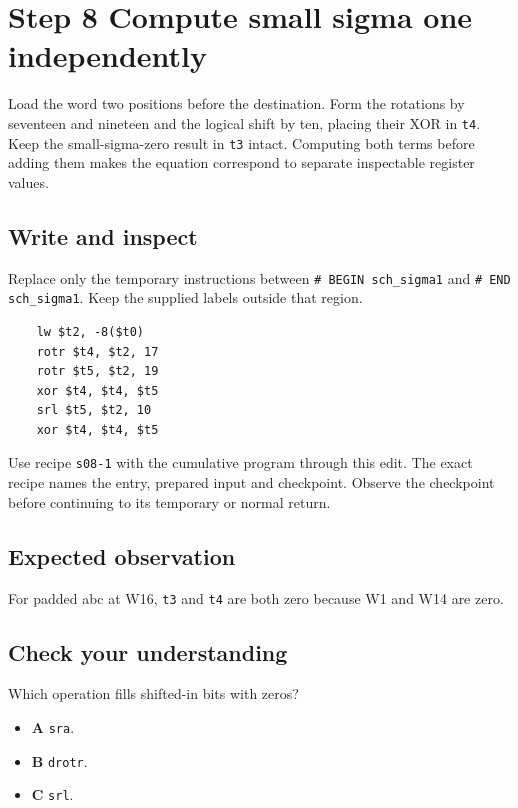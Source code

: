 \section{Step 8 Compute small sigma one independently}\label{sha-s08}

Load the word two positions before the destination. Form the rotations by seventeen and nineteen and the logical shift by ten, placing their XOR in \texttt{t4}. Keep the small-sigma-zero result in \texttt{t3} intact. Computing both terms before adding them makes the equation correspond to separate inspectable register values.

\subsection{Write and inspect}
Replace only the temporary instructions between \texttt{\# BEGIN sch\_sigma1} and \texttt{\# END sch\_sigma1}. Keep the supplied labels outside that region.

\begin{verbatim}
    lw $t2, -8($t0)
    rotr $t4, $t2, 17
    rotr $t5, $t2, 19
    xor $t4, $t4, $t5
    srl $t5, $t2, 10
    xor $t4, $t4, $t5
\end{verbatim}

Use recipe \texttt{s08-1} with the cumulative program through this edit. The exact recipe names the entry, prepared input and checkpoint. Observe the checkpoint before continuing to its temporary or normal return.

\subsection{Expected observation}
For padded abc at W16, \texttt{t3} and \texttt{t4} are both zero because W1 and W14 are zero.

\subsection{Check your understanding}
Which operation fills shifted-in bits with zeros?

\begin{itemize}
  \item \textbf{A} \texttt{sra}.
  \item \textbf{B} \texttt{drotr}.
  \item \textbf{C} \texttt{srl}.
\end{itemize}
